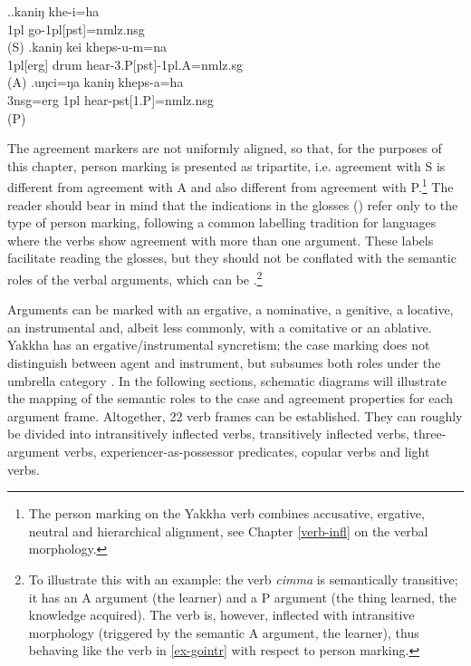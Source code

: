 \ex.\ag.\label{ex-gointr}kaniŋ khe-i=ha\\
{\sc 1pl} go{\sc -1pl[pst]=nmlz.nsg}\\
 (S)
\bg.kaniŋ kei kheps-u-m=na\\
{\sc 1pl[erg]} drum hear{\sc -3.P[pst]-1pl.A=nmlz.sg}\\
 (A)
\bg.uŋci=ŋa kaniŋ kheps-a=ha\\
{\sc 3nsg=erg} {\sc 1pl}  hear{\sc -pst[1.P]=nmlz.nsg}\\
 (P)


The agreement markers are not uniformly aligned, so that, for the purposes of this chapter, person marking is  presented as tripartite, i.e. agreement with S is different from agreement with A and also different from agreement with P.\footnote{The person marking on the Yakkha verb combines accusative, ergative, neutral and hierarchical alignment, see Chapter \ref{verb-infl} on the verbal morphology.} The reader should bear in mind that the indications in the glosses () refer only to the type of person marking, following a common labelling tradition for languages where the verbs show agreement with more than one argument. These labels facilitate reading  the glosses, but they should not be conflated with the semantic roles of the verbal arguments, which can be .\footnote{To illustrate this with an example: the verb \emph{cimma}  is semantically transitive; it has an A argument (the learner) and a P argument (the thing learned, the knowledge acquired). The verb  is, however, inflected with intransitive morphology (triggered by the semantic A argument, the learner), thus behaving like the verb in  \ref{ex-gointr} with respect to person marking.} 

Arguments can be marked with an ergative, a nominative, a genitive, a locative, an instrumental and, albeit less commonly, with a comitative or an ablative. Yakkha has an ergative/instrumental syncretism; the case marking does not distinguish between agent and instrument, but subsumes both roles under the umbrella category  \citep{VanValinetal1996The-case}. In the following sections, schematic diagrams will illustrate the mapping of the semantic roles to the case and agreement properties for each argument frame. Altogether, 22 verb frames can be established. They can roughly be divided into intransitively inflected verbs, transitively inflected verbs, three-argument verbs, experiencer-as-possessor predicates, copular verbs and light verbs.

